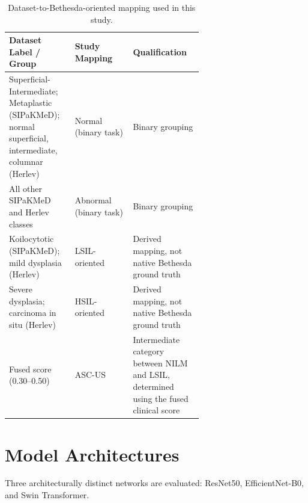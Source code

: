 \documentclass[conference]{IEEEtran}
\begin{document}
\begin{table}[t]
\caption{Dataset-to-Bethesda-oriented mapping used in this study.}
\label{tab:bethesda}
\centering
\small
\renewcommand{\arraystretch}{1.35}
\setlength{\tabcolsep}{4pt}

\begin{tabularx}{\linewidth}{
>{\raggedright\arraybackslash}p{0.34\linewidth}
>{\raggedright\arraybackslash}p{0.30\linewidth}
>{\raggedright\arraybackslash}X
}
\toprule

\textbf{Dataset Label / Group} &
\textbf{Study Mapping} &
\textbf{Qualification} \\

\midrule

Superficial-Intermediate; Metaplastic (SIPaKMeD); normal superficial, intermediate, columnar (Herlev)
&
Normal (binary task)
&
Binary grouping
\\

\midrule

All other SIPaKMeD and Herlev classes
&
Abnormal (binary task)
&
Binary grouping
\\

\midrule

Koilocytotic (SIPaKMeD); mild dysplasia (Herlev)
&
LSIL-oriented
&
Derived mapping, not native Bethesda ground truth
\\

\midrule

Severe dysplasia; carcinoma in situ (Herlev)
&
HSIL-oriented
&
Derived mapping, not native Bethesda ground truth
\\

\midrule

Fused score (0.30--0.50)
&
ASC-US
&
Intermediate category between NILM and LSIL, determined using the fused clinical score
\\

\bottomrule
\end{tabularx}
\end{table}

\section{Model Architectures}
\label{sec:archs}

Three architecturally distinct networks are evaluated: ResNet50, EfficientNet-B0, and Swin Transformer.
\end{document}
